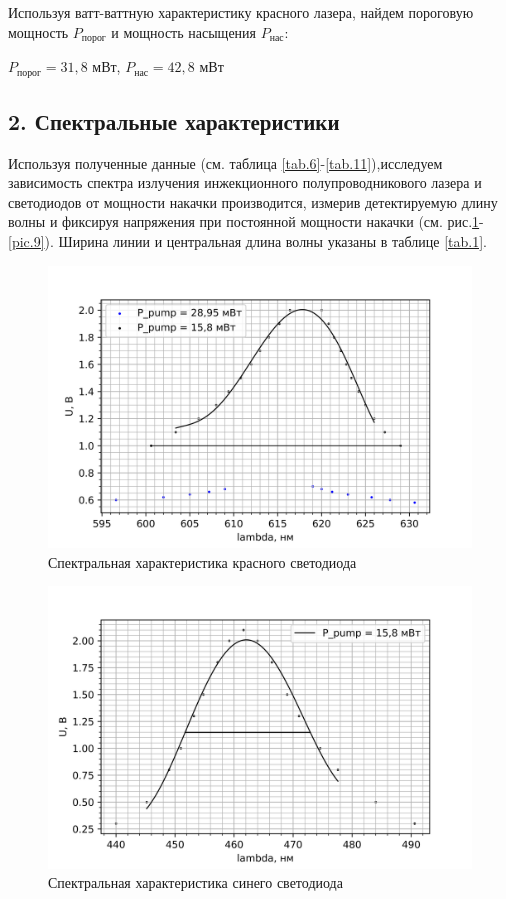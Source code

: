 \documentclass[a4paper,12pt]{report}
\begin{document}
Используя ватт-ваттную характеристику красного лазера, найдем пороговую мощность $P_{\text{порог}}$ и мощность насыщения $P_{\text{нас}}$:
\begin{center}
    $P_{\text{порог}} = 31,8$ мВт, $P_{\text{нас}} = 42,8$ мВт
\end{center}

\subsection*{2. Спектральные характеристики}

Используя полученные данные (см. таблица \ref{tab.6}-\ref{tab.11}),исследуем зависимость спектра излучения инжекционного полупроводникового лазера и светодиодов от мощности накачки производится, измерив детектируемую длину волны и фиксируя напряжения при постоянной мощности накачки (см. рис.\ref{pic.5}-\ref{pic.9}). Ширина линии и центральная длина волны указаны в таблице \ref{tab.1}.

\begin{figure}[H]
	\centering
	\includegraphics[scale=0.7]{Red_phdiod_2.png}
	\caption{Спектральная характеристика красного светодиода}
        \label{pic.5}
\end{figure}

\begin{figure}[H]
	\centering
	\includegraphics[scale=0.7]{Blue_phdiod_2.png}
	\caption{Спектральная характеристика синего светодиода}
        \label{pic.6}
\end{figure}
\end{document}

